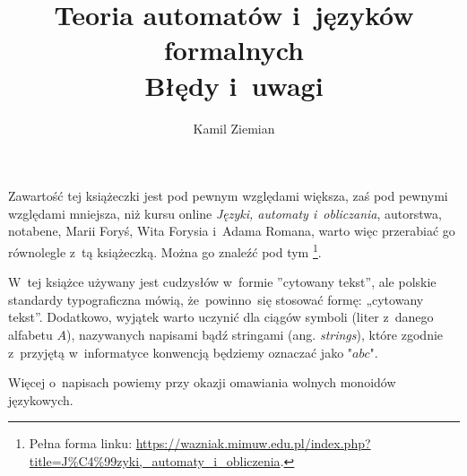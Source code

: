 \documentclass[a4paper,11pt]{article}
\title{Teoria automatów i~języków formalnych \\
  Błędy i~uwagi}
\author{Kamil Ziemian}
\begin{document}





\maketitle %









\start Zawartość tej książeczki jest pod pewnym względami większa, zaś
pod pewnymi względami mniejsza, niż kursu online \textit{Języki,
  automaty i~obliczania}, autorstwa, notabene, Marii Foryś, Wita
Forysia i~Adama Romana, warto więc przerabiać go równolegle z~tą
książeczką. Można go znaleźć pod tym
\footnote{Pełna forma linku:
  \href{https://wazniak.mimuw.edu.pl/index.php?title=J\%C4\%99zyki,\_automaty\_i\_obliczenia}
  {https://wazniak.mimuw.edu.pl/index.php?title=J\%C4\%99zyki,\_automaty\_i\_obliczenia}.}.

\vspace{\spaceFour}





\start W~tej książce używany jest cudzysłów w~formie ”cytowany tekst”,
ale polskie standardy typograficzna mówią, że~powinno~się stosować
formę: „cytowany tekst”. Dodatkowo, wyjątek warto uczynić dla ciągów
symboli (liter z~danego alfabetu $A$), nazywanych napisami bądź
stringami (ang. \textit{strings}), które zgodnie z~przyjętą
w~informatyce konwencją będziemy oznaczać jako $\texttt{"} abc \texttt{"}$.

Więcej o~napisach powiemy przy okazji omawiania wolnych monoidów językowych.






\end{document}
